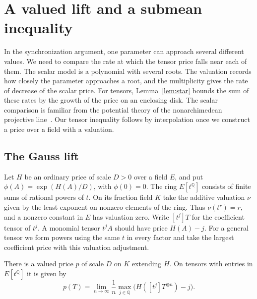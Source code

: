 \section{A valued lift and a submean inequality}\label{sec:valued}

In the synchronization argument, one parameter can approach several
different values. We need to compare the rate at which the tensor
price falls near each of them. The scalar model is a polynomial with
several roots. The valuation records how closely the parameter
approaches a root, and the multiplicity gives the rate of decrease
of the scalar price. For tensors, Lemma~\ref{lem:star} bounds the sum
of these rates by the growth of the price on an enclosing disk.
The scalar comparison is familiar from the potential theory of the
nonarchimedean projective line~\cite{BakerRumely}. Our tensor
inequality follows by interpolation once we construct a price over
a field with a valuation.

\subsection{The Gauss lift}

Let $H$ be an ordinary price of scale $D>0$ over a field $E$, and put
$\phi(A)=\exp(H(A)/D)$, with $\phi(0)=0$. The ring $E[t^{\mathbb Q}]$
consists of finite sums of rational powers of $t$. On its fraction
field $K$ take the additive valuation $\nu$ given by the least
exponent on nonzero elements of the ring. Thus $\nu(t^r)=r$, and a
nonzero constant in $E$ has valuation zero. Write $[t^j]T$ for the
coefficient tensor of $t^j$. A monomial tensor $t^j A$ should have
price $H(A)-j$. For a general tensor we form powers using the same
$t$ in every factor and take the largest coefficient price with
this valuation adjustment.

\begin{theorem}\label{thm:gauss}
There is a valued price $p$ of scale $D$ on $K$ extending $H$. On tensors
with entries in $E[t^{\mathbb Q}]$ it is given by
\begin{equation}\label{eq:gauss-price}
 p(T)=\lim_{n\to\infty}\frac1n
       \max_{j\in\mathbb Q}\bigl(H([t^j]T^{\otimes n})-j\bigr).
\end{equation}
\end{theorem}

